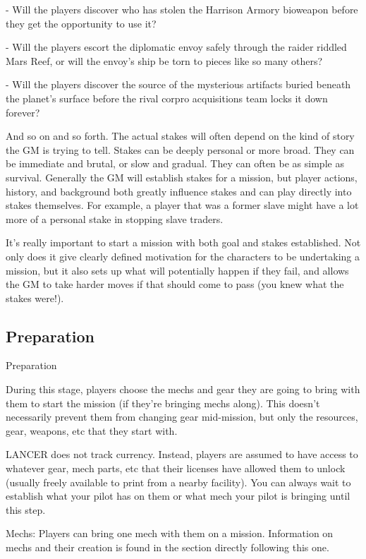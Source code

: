      -   Will the players discover who has stolen the Harrison Armory bioweapon before they get  
         the opportunity to use it?
 
     -   Will the players escort the diplomatic envoy safely through the raider riddled Mars Reef,  
         or will the envoy’s ship be torn to pieces like so many others?
 
     -   Will the players discover the source of the mysterious artifacts buried beneath the  
         planet’s surface before the rival corpro acquisitions team locks it down forever?
 

And so on and so forth. The actual stakes will often depend on the kind of story the GM is trying  
to tell. Stakes can be deeply personal or more broad. They can be immediate and brutal, or slow  
and gradual. They can often be as simple as survival. Generally the GM will establish stakes for a  
mission, but player actions, history, and background both greatly influence stakes and can play  
directly into stakes themselves. For example, a player that was a former slave might have a lot  
more of a personal stake in stopping slave traders.
 

It’s really important to start a mission with both goal and stakes established. Not only does it  
give clearly defined motivation for the characters to be undertaking a mission, but it also sets up  
what will potentially happen if they fail, and allows the GM to take harder moves if that should  
come to pass (you knew what the stakes were!).
 
\subsection{Preparation}
                                                Preparation
 

During this stage, players choose the mechs and gear they are going to bring with them to start  
the mission (if they’re bringing mechs along). This doesn’t necessarily prevent them from  
changing gear mid-mission, but only the resources, gear, weapons, etc that they start with.
 

LANCER does not track currency. Instead, players are assumed to have access to whatever gear,  
mech parts, etc that their licenses have allowed them to unlock (usually freely available to print  
from a nearby facility). You can always wait to establish what your pilot has on them or what  
mech your pilot is bringing until this step.
 

Mechs: Players can bring one mech with them on a mission. Information on mechs and their  
creation is found in the section directly following this one.
 
